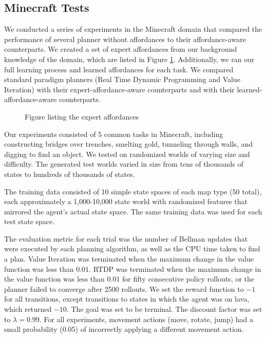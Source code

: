 \documentclass[conference]{IEEEtran}
\begin{document}
\subsection{Minecraft Tests}
We conducted a series of experiments in the Minecraft domain that
compared the performance of several planner without affordances
to their affordance-aware counterparts. We created a set of expert
affordances from our background knowledge of the domain, which are
listed in Figure \ref{fig:afford_kb_exp}. Additionally, we ran our full
learning process and learned affordances for each
task. We compared standard paradigm planners (Real Time Dynamic
Programming and Value Iteration) with their expert-affordance-aware
counterparts and with their learned-affordance-aware counterparts.

\begin{figure}
Figure listing the expert affordances
\label{fig:afford_kb_exp}
\end{figure}

Our experiments consisted of 5 common tasks in Minecraft, including
constructing bridges over trenches, smelting gold, tunneling
through walls, and digging to find an object.  We tested on 
randomized worlds of varying size and difficulty. The generated test
worlds varied in size from tens of thousands of states to hundreds of thousands of states.

The training data consisted of 10 simple state spaces of each map type
(50 total), each approximately a 1,000-10,000 state world with randomized
features that mirrored the agent's actual state space. The same training data
was used for each test state space.

The evaluation metric for each trial was the
number of Bellman updates that were executed by each planning
algorithm, as well as the CPU time taken to find a plan. Value Iteration was terminated when the maximum change in
the value function was less than 0.01. RTDP was terminated when the
maximum change in the value function was less than 0.01 for fifty
consecutive policy rollouts, or the planner failed to converge after 2500 rollouts.
We set the reward function to $-1$ for all transitions, except
transitions to states in which the agent was on lava, which returned 
$-10$. The goal was set to be terminal. The discount
factor was set to $\lambda = 0.99$. For all experiments, movement actions
(move, rotate, jump) had a small probability (0.05) of incorrectly applying a different movement action.
\end{document}
